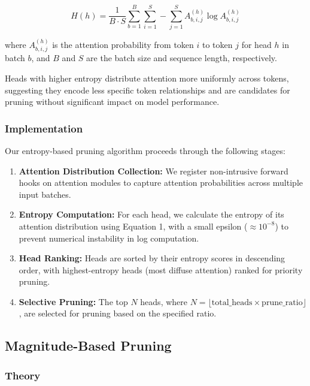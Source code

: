 \begin{equation}
H(h) = \frac{1}{B \cdot S} \sum_{b=1}^{B} \sum_{i=1}^{S} -\sum_{j=1}^{S} A^{(h)}_{b,i,j} \log A^{(h)}_{b,i,j}
\end{equation}

where $A^{(h)}_{b,i,j}$ is the attention probability from token $i$ to token $j$ for head $h$ in batch $b$, and $B$ and $S$ are the batch size and sequence length, respectively.

Heads with higher entropy distribute attention more uniformly across tokens, suggesting they encode less specific token relationships and are candidates for pruning without significant impact on model performance.

\subsubsection{Implementation}

Our entropy-based pruning algorithm proceeds through the following stages:

\begin{enumerate}
    \item \textbf{Attention Distribution Collection:} We register non-intrusive forward hooks on attention modules to capture attention probabilities across multiple input batches.
    
    \item \textbf{Entropy Computation:} For each head, we calculate the entropy of its attention distribution using Equation 1, with a small epsilon ($\approx 10^{-8}$) to prevent numerical instability in log computation.
    
    \item \textbf{Head Ranking:} Heads are sorted by their entropy scores in descending order, with highest-entropy heads (most diffuse attention) ranked for priority pruning.
    
    \item \textbf{Selective Pruning:} The top $N$ heads, where $N = \lfloor\text{total\_heads} \times \text{prune\_ratio}\rfloor$, are selected for pruning based on the specified ratio.
\end{enumerate}

\subsection{Magnitude-Based Pruning}

\subsubsection{Theory}


